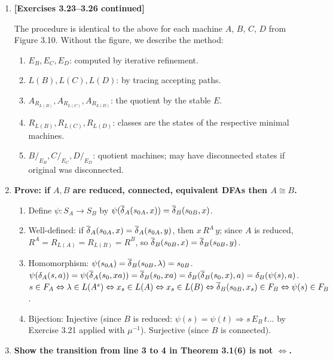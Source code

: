\begin{enumerate}[{3.}1.]
\item \textbf{[Exercises 3.23--3.26 continued]}

The procedure is identical to the above for each machine $A$, $B$, $C$, $D$ from Figure 3.10. Without the figure, we describe the method:
\begin{enumerate}
\item $E_B, E_C, E_D$: computed by iterative refinement.
\item $L(B), L(C), L(D)$: by tracing accepting paths.
\item $A_{R_{L(B)}}, A_{R_{L(C)}}, A_{R_{L(D)}}$: the quotient by the stable $E$.
\item $R_{L(B)}, R_{L(C)}, R_{L(D)}$: classes are the states of the respective minimal machines.
\item $B/_{E_B}, C/_{E_C}, D/_{E_D}$: quotient machines; may have disconnected states if original was disconnected.
\end{enumerate}

\item \textbf{Prove: if $A,B$ are reduced, connected, equivalent DFAs then $A\cong B$.}

\begin{enumerate}
\item Define $\psi: S_A\to S_B$ by $\psi(\overline{\delta}_A(s_{0A},x))=\overline{\delta}_B(s_{0B},x)$.

\item Well-defined: if $\overline{\delta}_A(s_{0A},x)=\overline{\delta}_A(s_{0A},y)$, then $x\,R^A\,y$; since $A$ is reduced, $R^A=R_{L(A)}=R_{L(B)}=R^B$, so $\overline{\delta}_B(s_{0B},x)=\overline{\delta}_B(s_{0B},y)$.

\item Homomorphism: $\psi(s_{0A})=\overline{\delta}_B(s_{0B},\lambda)=s_{0B}$. $\psi(\delta_A(s,a))=\psi(\overline{\delta}_A(s_0,xa))=\overline{\delta}_B(s_0,xa)=\delta_B(\overline{\delta}_B(s_0,x),a)=\delta_B(\psi(s),a)$. $s\in F_A\Leftrightarrow\lambda\in L(A^s)\Leftrightarrow x_s\in L(A)\Leftrightarrow x_s\in L(B)\Leftrightarrow\overline{\delta}_B(s_{0B},x_s)\in F_B\Leftrightarrow\psi(s)\in F_B$.

\item Bijection: Injective (since $B$ is reduced: $\psi(s)=\psi(t)\Rightarrow s\,E_B\,t$... by Exercise 3.21 applied with $\mu^{-1}$). Surjective (since $B$ is connected).
\end{enumerate}

\item \textbf{Show the transition from line 3 to 4 in Theorem 3.1(6) is not $\Leftrightarrow$.}


\end{enumerate}
